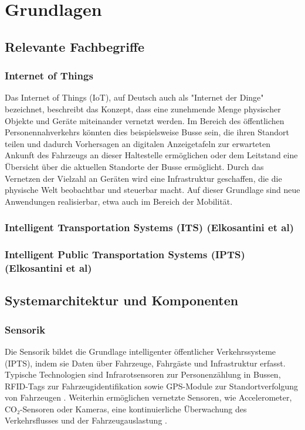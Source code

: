 \section{Grundlagen}
\subsection{Relevante Fachbegriffe} %
\subsubsection{Internet of Things}

Das Internet of Things (IoT), auf Deutsch auch als "Internet der Dinge" bezeichnet, beschreibt das Konzept, dass eine zunehmende Menge physischer Objekte und Geräte miteinander vernetzt werden.
Im Bereich des öffentlichen Personennahverkehrs könnten dies beispielsweise Busse sein, die ihren Standort teilen und dadurch Vorhersagen an digitalen Anzeigetafeln zur erwarteten Ankunft des Fahrzeugs an dieser Haltestelle ermöglichen oder dem Leitstand eine Übersicht über die aktuellen Standorte der Busse ermöglicht.
Durch das Vernetzen der Vielzahl an Geräten wird eine Infrastruktur geschaffen, die die physische Welt beobachtbar und steuerbar macht.
Auf dieser Grundlage sind neue Anwendungen realisierbar, etwa auch im Bereich der Mobilität.


\subsubsection{Intelligent Transportation Systems (ITS) (Elkosantini et al)}
\subsubsection{Intelligent Public Transportation Systems (IPTS) (Elkosantini et al)}
\subsection{Systemarchitektur und Komponenten}
\subsubsection{Sensorik}
Die Sensorik bildet die Grundlage intelligenter öffentlicher Verkehrssysteme (IPTS), indem sie Daten über Fahrzeuge, Fahrgäste und Infrastruktur erfasst. Typische Technologien sind Infrarotsensoren zur Personenzählung in Bussen, RFID-Tags zur Fahrzeugidentifikation sowie GPS-Module zur Standortverfolgung von Fahrzeugen \cite{Li2019}. Weiterhin ermöglichen vernetzte Sensoren, wie Accelerometer, CO₂-Sensoren oder Kameras, eine kontinuierliche Überwachung des Verkehrsflusses und der Fahrzeugauslastung \cite{Luo2019}.

